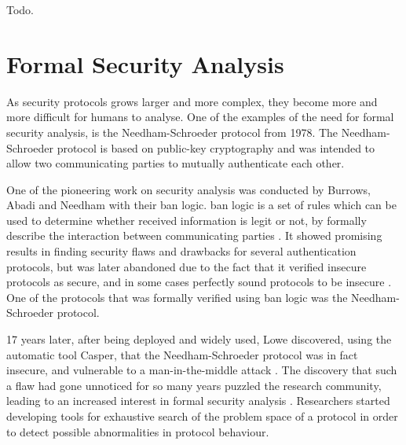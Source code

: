 Todo.

\section{Formal Security Analysis} 


As security protocols grows larger and more complex, they become more and more difficult for humans to analyse. One of the examples of the need for formal security analysis, is the Needham-Schroeder protocol \cite{Needham:1978} from 1978. The Needham-Schroeder protocol is based on public-key cryptography and was intended to allow two communicating parties to mutually authenticate each other.


One of the pioneering work on security analysis was conducted by Burrows, Abadi and Needham with their \gls{ban} logic. \gls{ban} logic is a set of rules which can be used to determine whether received information is legit or not, by formally describe the interaction between communicating parties \cite{burrows1989logic}. It showed promising results in finding security flaws and drawbacks for several authentication protocols, but was later abandoned due to the fact that it verified insecure protocols as secure, and in some cases perfectly sound protocols to be insecure \cite{boyd1993}. One of the protocols that was formally verified using \gls{ban} logic was the Needham-Schroeder protocol.


17 years later, after being deployed and widely used, Lowe discovered, using the automatic tool Casper, that the Needham-Schroeder protocol was in fact insecure, and vulnerable to a man-in-the-middle attack \cite{basin2011model} \cite{lowe1996}. The discovery that such a flaw had gone unnoticed for so many years puzzled the research community, leading to an increased interest in formal security analysis \cite{cremers2009comparing}. Researchers started developing tools for exhaustive search of the problem space of a protocol in order to detect possible abnormalities in protocol behaviour. 




